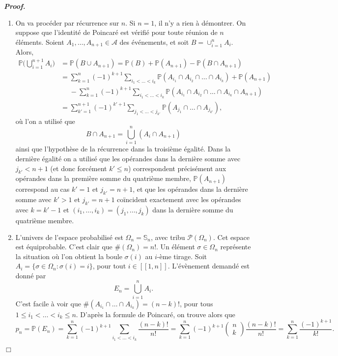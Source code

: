 \documentclass[11pt,a4paper]{article}
\newenvironment{preuve}[1][]
{\vskip 2mm  \noindent\emph{\bf Proof#1. }}{$\Box$ \vskip 2mm}
\let\leq\leqslant
\begin{document}
		\begin{preuve}
			\begin{enumerate}
				\item On va procéder par récurrence sur $n$. 
				Si $n = 1$, il n'y a rien à démontrer. 
				On suppose que l'identité de Poincaré est vérifié pour toute réunion de $n$ éléments. 
				Soient $A_1, \dots, A_{n+1} \in \mathscr{A}$ des événements, et soit $B = \cup_{i=1}^{n} A_{i}$.
				Alors, 
				\begin{align*}
				\mathbb{P}\bigg(\bigcup_{i=1}^{n+1} A_{i} \bigg) 
				&= \mathbb{P}(B \cup A_{n+1}) 
				= \mathbb{P}(B) + \mathbb{P}(A_{n+1}) - \mathbb{P}(B \cap A_{n+1}) 
				\\
				&= \sum_{k=1}^{n}(-1)^{k+1} \sum_{i_1<\dots<i_k} \mathbb{P}(A_{i_1} \cap A_{i_2} \cap \ldots\cap A_{i_k}) + \mathbb{P}(A_{n+1})
				\\
				& \phantom{=} - \sum_{k=1}^{n}(-1)^{k+1} \sum_{i_1<\dots<i_k} \mathbb{P}(A_{i_1} \cap A_{i_2} \cap \ldots\cap A_{i_k} \cap A_{n+1})
				\\
				&= \sum_{k'=1}^{n+1}(-1)^{k'+1} \sum_{j_1<\dots<j_{k'}} \mathbb{P}(A_{j_1} \cap \dots \cap A_{j_{k'}}),
				\end{align*}
				où l'on a utilisé que 
				\[     B \cap A_{n+1} = \bigcup_{i=1}^{n} (A_{i} \cap A_{n+1})     \]
				ainsi que l'hypothèse de la récurrence dans la troisième égalité. 
				Dans la dernière égalité on a utilisé que les opérandes dans la dernière somme avec $j_{k'} < n+ 1$ (et donc forcément $k' \leq n$) 
				correspondent précisément aux opérandes dans la première somme du quatrième membre, $\mathbb{P}(A_{n+1})$ correspond au cas 
				$k' = 1$ et $j_{k'} = n+ 1$, et que les opérandes dans la dernière somme avec $k' > 1$ et $j_{k'} = n+ 1$ coïncident exactement avec les opérandes avec $k = k'-1$ et $(i_{1},\dots,i_{k}) = (j_{1},\dots,j_{k})$ dans la dernière somme du quatrième membre.  
				
				\item L'univers de l'espace probabilisé est $\Omega_{n} = \mathbb{S}_{n}$, avec tribu $\mathscr{P}(\Omega_{n})$. 
				Cet espace est équiprobable. 
				C'est clair que $\#(\Omega_{n}) = n!$. 
				Un élément $\sigma \in \Omega_{n}$ représente la situation où l'on obtient la boule $\sigma(i)$ au $i$-ème tirage. 
				Soit $A_{i} = \{ \sigma \in \Omega_{n} : \sigma(i) = i \}$, pour tout $i \in [\![ 1 , n ]\!]$. 
				L'évènement demandé est donné par 
				\[     E_{n} = \bigcup_{i=1}^{n} A_{i}.     \]
				C'est facile à voir que $\#(A_{i_1} \cap \dots \cap A_{i_{k}}) = (n-k)!$, pour tous $1 \leq i_1<\dots<i_k \leq n$.
				D'après la formule de Poincaré, on trouve alors que 
				\[     p_{n} = \mathbb{P}(E_{n}) = \sum_{k=1}^{n}(-1)^{k+1} \sum_{i_1<\dots<i_k} \frac{(n-k)!}{n!} = \sum_{k=1}^{n}(-1)^{k+1} \begin{pmatrix}n \\ k\end{pmatrix} \frac{(n-k)!}{n!} = \sum_{k=1}^{n} \frac{(-1)^{k+1}}{k!}.     \] 
				

\end{enumerate}
\end{preuve}
\end{document}
